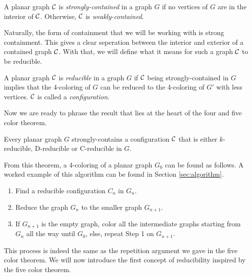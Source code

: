 \begin{definition}
    A planar graph $\mathcal{C}$ is \emph{strongly-contained} in a graph $G$ if no vertices of $G$ are in the interior of $\mathcal{C}$. Otherwise, $\mathcal{C}$ is \emph{weakly-contained}.
\end{definition}

Naturally, the form of containment that we will be working with is strong containment. This gives a clear seperation between the interior and exterior of a contained graph $\mathcal{C}$. With that, we will define what it means for such a graph $\mathcal{C}$ to be reducible.

\begin{definition}
    A planar graph $\mathcal{C}$ is \emph{reducible} in a graph $G$ if $\mathcal{C}$ being strongly-contained in $G$ implies that the 4-coloring of $G$ can be reduced to the 4-coloring of $G'$ with less vertices. $\mathcal{C}$ is called a \emph{configuration}.
\end{definition}

Now we are ready to phrase the result that lies at the heart of the four and five color theorem.

\begin{theorem}
    \label{funda1}
    Every planar graph $G$ strongly-contains a configuration $\mathcal{C}$ that is either $k$-reducible, D-reducible or C-reducible in $G$.
\end{theorem}

From this theorem, a 4-coloring of a planar graph $G_0$ can be found as follows. A worked example of this algorithm can be found in Section \ref{sec:algorithm}.

\begin{enumerate}
    \item Find a reducible configuration $C_n$ in $G_n$.
    \item Reduce the graph $G_n$ to the smaller graph $G_{n+1}$.
    \item If $G_{n+1}$ is the empty graph, color all the intermediate graphs starting from $G_n$ all the way until $G_0$, else, repeat Step 1 on $G_{n+1}$.
\end{enumerate}

This process is indeed the same as the repetition argument we gave in the five color theorem. We will now introduce the first concept of reducibility inspired by the five color theorem. 